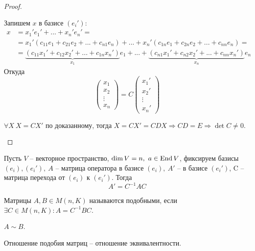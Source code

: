 \begin{proof}
	\begin{MyList}
		\item Запишем $x$ в базисе $(e_i')$:
		\begin{align*}
			x &= x_1' e_1' + ... + x_n'e_n' = \\
			&= x_1'(c_{11}e_1 + c_{21}e_2 +... + c_{n1}e_n) + ... + x_n'(c_{1n}e_1 + c_{2n}e_2 + ... + c_{nn}e_n) = \\
			&= \underbrace{(c_{11}x_1' + c_{12}x_2' + ... + c_{1n}x_n')}_{x_1} e_1 + ... + \underbrace{(c_{n1}x_1' + c_{n2}x_2' + ... + c_{nn}x_n')}_{x_n} e_n
		\end{align*}
		Откуда
		\[ \left(\begin{array}{c}
			x_1 \\ 
			x_2 \\ 
			\vdots \\ 
			x_n
			\end{array}\right) = C \left(\begin{array}{c}
			x_1' \\ 
			x_2' \\ 
			\vdots \\ 
			x_n'
			\end{array}\right)\]
		\item $ \forall X \ X = C X'$ по доказанному, тогда $ X = C X' = C D X \Rightarrow CD = E \Rightarrow \det C \neq 0$.
	\end{MyList}
\end{proof}

\begin{Thm}
	Пусть $V$ -- векторное пространство, $\dim V = n, \ a \in \operatorname{End} V$, фиксируем базисы $(e_i), (e_i'), \ A$ -- матрица оператора в базисе $(e_i), \ A'$ -- в базисе $(e_i')$, C -- матрица перехода от $(e_i) \text{ к } (e_i')$. Тогда
	$$A' = C^{-1} A C$$ 
\end{Thm}

\gdef\AuthorName{Ксения Кузьмина}

\begin{Def} 
	Матрицы $A, B \in M(n, K)$ называются подобными, если $\exists C \in M(n, K): A = C^{-1} B C$. 
\end{Def} 

\begin{notation}
	$ A \sim B$.
\end{notation}

\begin{Thm} 
	Отношение подобия матриц -- отношение эквивалентности. 
\end{Thm} 

